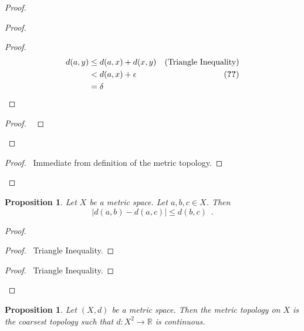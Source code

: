 \documentclass{book}
\let\qed\relax
\newtheorem{prop}[ax]{Proposition}
\theoremstyle{definition}
\begin{document}
\begin{proof}
\pf
{}
\begin{proof}
	\begin{proof}
		\pf
		\begin{align*}
			d(a,y) & \leq d(a,x) + d(x,y) & (\text{Triangle Inequality}) \\
			& < d(a,x) + \epsilon & (\text{\stepref{e}}) \\
			& = \delta
		\end{align*}
	\end{proof}
	\begin{proof}
		\pf\ 
	\end{proof}
\end{proof}
\begin{proof}
	\pf\ Immediate from definition of the metric topology.
\end{proof}
\qed
\end{proof}

\begin{prop}
\label{prop:distance_between_distances}
Let $X$ be a metric space. Let $a,b,c \in X$. Then
\[ |d(a,b) - d(a,c)| \leq d(b,c) \enspace . \]
\end{prop}

\begin{proof}
\pf
{}
\begin{proof}
	\pf\ Triangle Inequality.
\end{proof}
\begin{proof}
	\pf\ Triangle Inequality.
\end{proof}
\qed
\end{proof}

\begin{prop}
Let $(X,d)$ be a metric space. Then the metric topology on $X$ is the coarsest topology such that $d : X^2 \rightarrow \mathbb{R}$ is continuous.
\end{prop}
\end{document}

